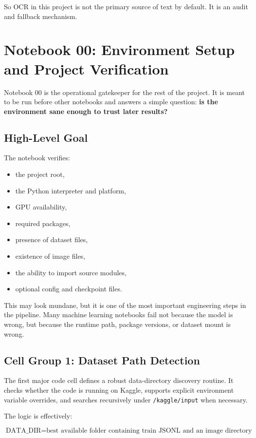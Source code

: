 \documentclass[11pt,a4paper]{report}
\begin{document}
So OCR in this project is not the primary source of text by default. It is an audit and fallback mechanism.

\chapter{Notebook 00: Environment Setup and Project Verification}

Notebook 00 is the operational gatekeeper for the rest of the project. It is meant to be run before other notebooks and answers a simple question: \textbf{is the environment sane enough to trust later results?}

\section{High-Level Goal}

The notebook verifies:

\begin{itemize}
\item the project root,
\item the Python interpreter and platform,
\item GPU availability,
\item required packages,
\item presence of dataset files,
\item existence of image files,
\item the ability to import source modules,
\item optional config and checkpoint files.
\end{itemize}

This may look mundane, but it is one of the most important engineering steps in the pipeline. Many machine learning notebooks fail not because the model is wrong, but because the runtime path, package versions, or dataset mount is wrong.

\section{Cell Group 1: Dataset Path Detection}

The first major code cell defines a robust data-directory discovery routine. It checks whether the code is running on Kaggle, supports explicit environment variable overrides, and searches recursively under \texttt{/kaggle/input} when necessary.

The logic is effectively:

\[
\text{DATA\_DIR} = \text{best available folder containing train JSONL and an image directory}
\]
\end{document}
